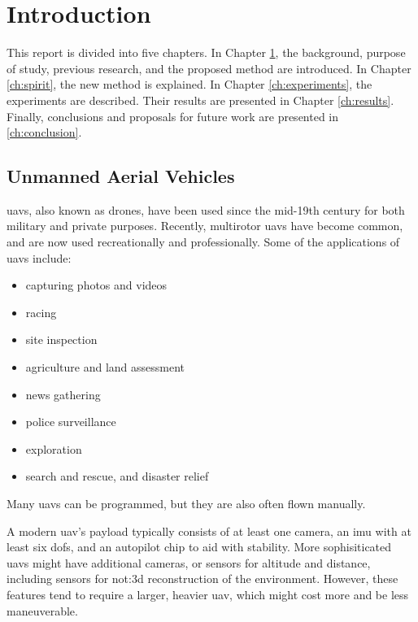\chapter{Introduction}
\label{ch:intro}
This report is divided into five chapters.
In Chapter \ref{ch:intro}, the background, purpose of study, previous research, and the proposed method are introduced.
In Chapter \ref{ch:spirit}, the new method is explained.
In Chapter \ref{ch:experiments}, the experiments are described.
Their results are presented in Chapter \ref{ch:results}.
Finally, conclusions and proposals for future work are presented in \ref{ch:conclusion}.

\section{Unmanned Aerial Vehicles}
\Glspl{uav}, also known as drones, have been used since the mid-19th century for both military and private purposes.
Recently, multirotor \glspl{uav} have become common, and are now used recreationally and professionally.
Some of the applications of \glspl{uav} include:

\begin{itemize}
  \item capturing photos and videos
  \item racing
  \item site inspection
  \item agriculture and land assessment
  \item news gathering
  \item police surveillance
  \item exploration
  \item search and rescue, and disaster relief
\end{itemize}

Many \glspl{uav} can be programmed, but they are also often flown manually.

A modern \gls{uav}'s payload typically consists of at least one camera, an \gls{imu} with at least six \glspl{dof}, and an autopilot chip to aid with stability.
More sophisiticated \glspl{uav} might have additional cameras, or sensors for altitude and distance, including sensors for \gls{not:3d} reconstruction of the environment.
However, these features tend to require a larger, heavier \gls{uav}, which might cost more and be less maneuverable.

